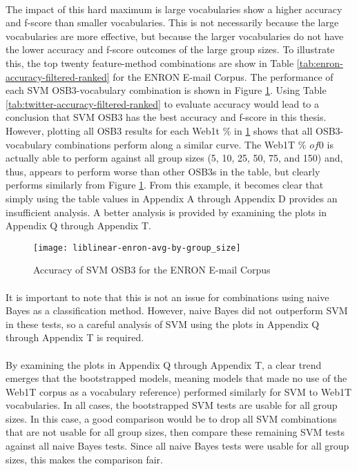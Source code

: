 	\paragraph*{} The impact of this hard maximum is large vocabularies show a higher accuracy and f-score than smaller vocabularies.  This is not necessarily because the large vocabularies are more effective, but because the larger vocabularies do not have the lower accuracy and f-score outcomes of the large group sizes.  To illustrate this, the top twenty feature-method combinations are show in Table \ref{tab:enron-accuracy-filtered-ranked} for the ENRON E-mail Corpus.  The performance of each SVM OSB3-vocabulary combination is shown in Figure \ref{fig:plot-liblinear-enron-accuracy}. Using Table \ref{tab:twitter-accuracy-filtered-ranked} to evaluate accuracy would lead to a conclusion that SVM OSB3 has the best accuracy and f-score in this thesis.  However, plotting all OSB3 results for each Web1t \%  in \ref{fig:plot-liblinear-enron-accuracy} shows that all OSB3-vocabulary combinations perform along a similar curve.  The Web1T \% $ of 0$ is actually able to perform against all group sizes (5, 10, 25, 50, 75, and 150) and, thus, appears to perform worse than other OSB3s in the table, but clearly performs similarly from Figure \ref{fig:plot-liblinear-enron-accuracy}.  From this example, it becomes clear that simply using the table values in Appendix A through Appendix D provides an insufficient analysis.  A better analysis is provided by examining the plots in Appendix Q through Appendix T.  
	
\begin{figure}[htbp!]
	\centering
	\texttt{[image: liblinear-enron-avg-by-group\_size]}
	\caption{Accuracy of SVM OSB3 for the ENRON E-mail Corpus}
	\label{fig:plot-liblinear-enron-accuracy}
\end{figure}
	
	\paragraph*{}It is important to note that this is not an issue for combinations using naive Bayes as a classification method.  However, naive Bayes did not outperform SVM in these tests, so a careful analysis of SVM using the plots in Appendix Q through Appendix T is required.

	\paragraph*{} By examining the plots in Appendix Q through Appendix T, a clear trend emerges that the bootstrapped models, meaning models that made no use of the Web1T corpus as a vocabulary reference) performed similarly for SVM to Web1T vocabularies.  In all cases, the bootstrapped SVM tests are usable for all group sizes.  In this case, a good comparison would be to drop all SVM combinations that are not usable for all group sizes, then compare these remaining SVM tests against all naive Bayes tests.  Since all naive Bayes tests were usable for all group sizes, this makes the comparison fair.
	

